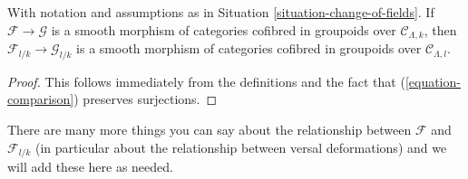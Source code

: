 \begin{lemma}
\label{lemma-change-of-fields-smooth}
With notation and assumptions as in Situation \ref{situation-change-of-fields}.
If $\mathcal{F} \to \mathcal{G}$ is a smooth morphism of categories cofibred
in groupoids over $\mathcal{C}_{\Lambda, k}$, then
$\mathcal{F}_{l/k} \to \mathcal{G}_{l/k}$ is a smooth morphism of categories
cofibred in groupoids over $\mathcal{C}_{\Lambda, l}$.
\end{lemma}

\begin{proof}
This follows immediately from the definitions and the fact that
(\ref{equation-comparison}) preserves surjections.
\end{proof}

\noindent
There are many more things you can say about the relationship between
$\mathcal{F}$ and $\mathcal{F}_{l/k}$ (in particular about the relationship
between versal deformations) and we will add these here as needed.












